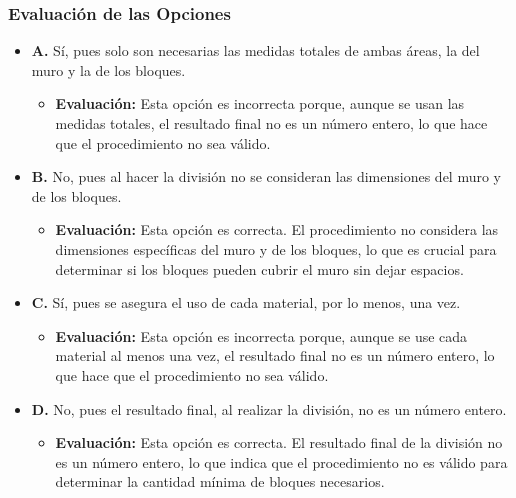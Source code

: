 \documentclass[
]{article}
\providecommand{\tightlist}{%
  \setlength{\itemsep}{0pt}\setlength{\parskip}{0pt}}
\begin{document}
\subsubsection{Evaluación de las
Opciones}\label{evaluaciuxf3n-de-las-opciones}

\begin{itemize}
\tightlist
\item
  \textbf{A.} Sí, pues solo son necesarias las medidas totales de ambas
  áreas, la del muro y la de los bloques.

  \begin{itemize}
  \tightlist
  \item
    \textbf{Evaluación:} Esta opción es incorrecta porque, aunque se
    usan las medidas totales, el resultado final no es un número entero,
    lo que hace que el procedimiento no sea válido.
  \end{itemize}
\item
  \textbf{B.} No, pues al hacer la división no se consideran las
  dimensiones del muro y de los bloques.

  \begin{itemize}
  \tightlist
  \item
    \textbf{Evaluación:} Esta opción es correcta. El procedimiento no
    considera las dimensiones específicas del muro y de los bloques, lo
    que es crucial para determinar si los bloques pueden cubrir el muro
    sin dejar espacios.
  \end{itemize}
\item
  \textbf{C.} Sí, pues se asegura el uso de cada material, por lo menos,
  una vez.

  \begin{itemize}
  \tightlist
  \item
    \textbf{Evaluación:} Esta opción es incorrecta porque, aunque se use
    cada material al menos una vez, el resultado final no es un número
    entero, lo que hace que el procedimiento no sea válido.
  \end{itemize}
\item
  \textbf{D.} No, pues el resultado final, al realizar la división, no
  es un número entero.

  \begin{itemize}
  \tightlist
  \item
    \textbf{Evaluación:} Esta opción es correcta. El resultado final de
    la división no es un número entero, lo que indica que el
    procedimiento no es válido para determinar la cantidad mínima de
    bloques necesarios.
  \end{itemize}
\end{itemize}
\end{document}
